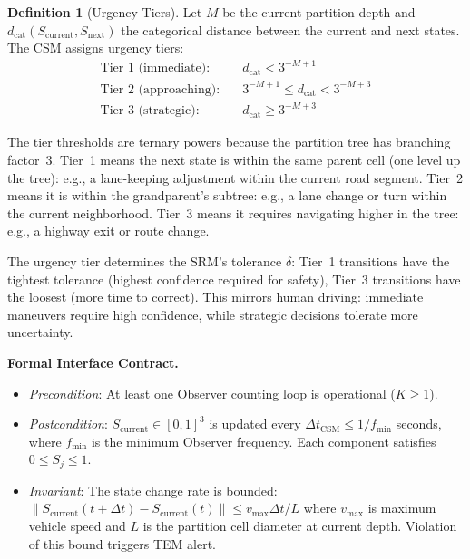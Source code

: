 \documentclass[twocolumn,10pt]{article}
\theoremstyle{definition}
\newtheorem{definition}[theorem]{Definition}
\newcommand{\dcat}{d_{\mathrm{cat}}}
\newcommand{\Scurrent}{S_{\mathrm{current}}}
\newcommand{\Snext}{S_{\mathrm{next}}}
\begin{document}
\begin{definition}[Urgency Tiers]
\label{def:urgency}
Let $M$ be the current partition depth and $\dcat(\Scurrent, \Snext)$ the categorical distance between the current and next states. The CSM assigns urgency tiers:
\begin{align}
\text{Tier 1 (immediate):} &\quad \dcat < 3^{-M+1} \label{eq:tier1}\\
\text{Tier 2 (approaching):} &\quad 3^{-M+1} \leq \dcat < 3^{-M+3} \label{eq:tier2}\\
\text{Tier 3 (strategic):} &\quad \dcat \geq 3^{-M+3} \label{eq:tier3}
\end{align}
\end{definition}

The tier thresholds are ternary powers because the partition tree has branching factor~3. Tier~1 means the next state is within the same parent cell (one level up the tree): e.g., a lane-keeping adjustment within the current road segment. Tier~2 means it is within the grandparent's subtree: e.g., a lane change or turn within the current neighborhood. Tier~3 means it requires navigating higher in the tree: e.g., a highway exit or route change.

The urgency tier determines the SRM's tolerance $\delta$: Tier~1 transitions have the tightest tolerance (highest confidence required for safety), Tier~3 transitions have the loosest (more time to correct). This mirrors human driving: immediate maneuvers require high confidence, while strategic decisions tolerate more uncertainty.

\textbf{Formal Interface Contract.}
\begin{itemize}[leftmargin=*]
\item \emph{Precondition}: At least one Observer counting loop is operational ($K \geq 1$).
\item \emph{Postcondition}: $\Scurrent \in [0,1]^3$ is updated every $\Delta t_{\mathrm{CSM}} \leq 1/f_{\min}$ seconds, where $f_{\min}$ is the minimum Observer frequency. Each component satisfies $0 \leq S_j \leq 1$.
\item \emph{Invariant}: The state change rate is bounded: $\|\Scurrent(t+\Delta t) - \Scurrent(t)\| \leq v_{\max} \Delta t / L$ where $v_{\max}$ is maximum vehicle speed and $L$ is the partition cell diameter at current depth. Violation of this bound triggers TEM alert.
\end{itemize}


\end{document}
